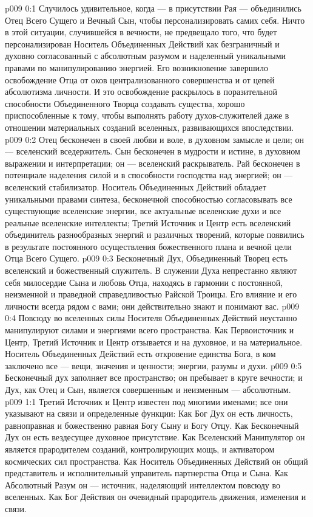 \author{Божественный Советник}
\vs p009 0:1 Случилось удивительное, когда --- в присутствии Рая --- объединились Отец Всего Сущего и Вечный Сын, чтобы персонализировать самих себя. Ничто в этой ситуации, случившейся в вечности, не предвещало того, что будет персонализирован Носитель Объединенных Действий как безграничный и духовно согласованный с абсолютным разумом и наделенный уникальными правами по манипулированию энергией. Его возникновение завершило освобождение Отца от оков централизованного совершенства и от цепей абсолютизма личности. И это освобождение раскрылось в поразительной способности Объединенного Творца создавать существа, хорошо приспособленные к тому, чтобы выполнять работу духов\hyp{}служителей даже в отношении материальных созданий вселенных, развивающихся впоследствии.
\vs p009 0:2 \pc Отец бесконечен в своей любви и воле, в духовном замысле и цели; он --- вселенский вседержитель. Сын бесконечен в мудрости и истине, в духовном выражении и интерпретации; он --- вселенский раскрыватель. Рай бесконечен в потенциале наделения силой и в способности господства над энергией; он --- вселенский стабилизатор. Носитель Объединенных Действий обладает уникальными правами синтеза, бесконечной способностью согласовывать все существующие вселенские энергии, все актуальные вселенские духи и все реальные вселенские интеллекты; Третий Источник и Центр есть вселенский объединитель разнообразных энергий и различных творений, которые появились в результате постоянного осуществления божественного плана и вечной цели Отца Всего Сущего.
\vs p009 0:3 Бесконечный Дух, Объединенный Творец есть вселенский и божественный служитель. В служении Духа непрестанно являют себя милосердие Сына и любовь Отца, находясь в гармонии с постоянной, неизменной и праведной справедливостью Райской Троицы. Его влияние и его личности всегда рядом с вами; они действительно знают и понимают вас.
\vs p009 0:4 Повсюду во вселенных силы Носителя Объединенных Действий неустанно манипулируют силами и энергиями всего пространства. Как Первоисточник и Центр, Третий Источник и Центр отзывается и на духовное, и на материальное. Носитель Объединенных Действий есть откровение единства Бога, в ком заключено все --- вещи, значения и ценности; энергии, разумы и духи.
\vs p009 0:5 \pc Бесконечный дух заполняет все пространство; он пребывает в круге вечности; и Дух, как Отец и Сын, является совершенным и неизменным --- абсолютным.
\vs p009 1:1 Третий Источник и Центр известен под многими именами; все они указывают на связи и определенные функции: Как Бог Дух он есть личность, равноправная и божественно равная Богу Сыну и Богу Отцу. Как Бесконечный Дух он есть вездесущее духовное присутствие. Как Вселенский Манипулятор он является прародителем созданий, контролирующих мощь, и активатором космических сил пространства. Как Носитель Объединенных Действий он общий представитель и исполнительный управитель партнерства Отца и Сына. Как Абсолютный Разум он --- источник, наделяющий интеллектом повсюду во вселенных. Как Бог Действия он очевидный прародитель движения, изменения и связи.
